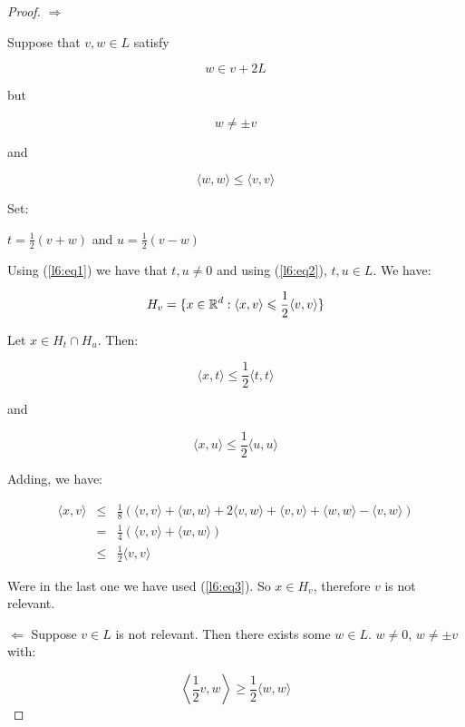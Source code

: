 \begin{proof}
 \underline{$\Longrightarrow$}

Suppose that $v,w\in L$ satisfy 

\begin{equation}\label{l6:eq1}
w\in v+2L 
\end{equation}

but

\begin{equation}\label{l6:eq2}
 w\neq \pm v
\end{equation}

and

\begin{equation}\label{l6:eq3}
 \langle w,w\rangle\leqslant \langle v,v\rangle
\end{equation}

Set:

\begin{center}
 $t=\frac{1}{2}(v+w)$ and  $u=\frac{1}{2}(v-w)$
\end{center}

Using (\ref{l6:eq1}) we have that $t,u\neq 0$ and using (\ref{l6:eq2}), $t,u\in L$. We have:

$$H_v=\{x\in\mathbb{R}^d:\langle x,v\rangle\leqslant \frac{1}{2}\langle v,v\rangle\}$$

Let $x\in H_t\cap H_u$. Then:

$$\langle x,t\rangle\leqslant \frac{1}{2}\langle t,t\rangle$$ 

and

$$\langle x,u\rangle\leqslant \frac{1}{2}\langle u,u\rangle$$

Adding, we have:

$$\begin{array}{rcl}
   \langle x,v\rangle	&\leqslant	&\frac{1}{8}\left(\langle v,v\rangle+\langle w,w\rangle+2\langle v,w\rangle+\langle 							v,v\rangle+\langle w,w\rangle-\langle v,w\rangle\right)\\
			&=		&\frac{1}{4}\left(\langle v,v\rangle+\langle w,w\rangle\right)\\
			&\leqslant	&\frac{1}{2}\langle v,v\rangle
  \end{array}
$$ 

Were in the last one we have used (\ref{l6:eq3}). So $x\in H_v$, therefore $v$ is not relevant.

 \underline{$\Longleftarrow$}
Suppose $v\in L$ is not relevant. Then there exists some $w \in L$. $w\neq 0$, $w\neq \pm v$ with:

\begin{equation}\label{l6:eq4}
 \left\langle \frac{1}{2} v, w\right\rangle \geqslant \frac{1}{2}\langle w,w\rangle
\end{equation}


\end{proof}
